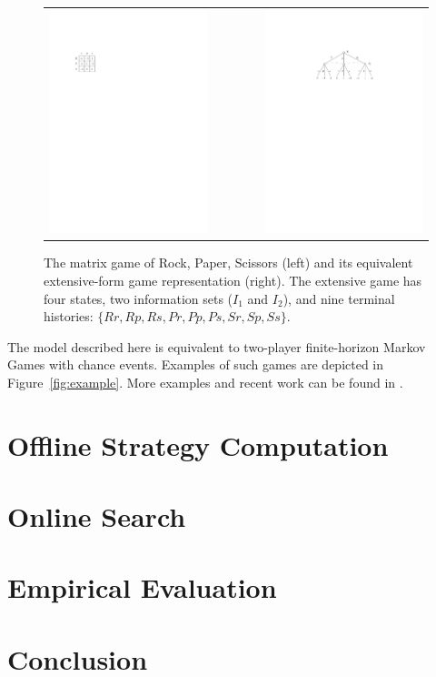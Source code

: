 \documentclass[preprint,12pt]{elsarticle}
\begin{document}
\begin{figure}
\begin{center}
\begin{tabular}{ccc}
\includegraphics[scale=1.4]{figures/rps-nfg} & ~~~~~ & \includegraphics[scale=1.0]{figures/rps-efg} \\
\end{tabular}
\end{center}
\caption{The matrix game of Rock, Paper, Scissors (left) and its equivalent extensive-form game representation (right). The extensive 
game has four states, two information sets ($I_1$ and $I_2$), 
and nine terminal histories: $\{ Rr, Rp, Rs, Pr, Pp, Ps, Sr, Sp, Ss \}$. \label{fig:rps-equiv}}
\end{figure}

The model described here is equivalent to two-player finite-horizon Markov Games with chance 
events. Examples of such games are depicted in Figure~\ref{fig:example}. More examples and recent work 
can be found in \cite[Chapter 5]{Saffidine2013thesis}.

\section{Offline Strategy Computation}



\section{Online Search}



\section{Empirical Evaluation}



\section{Conclusion}










\end{document}
